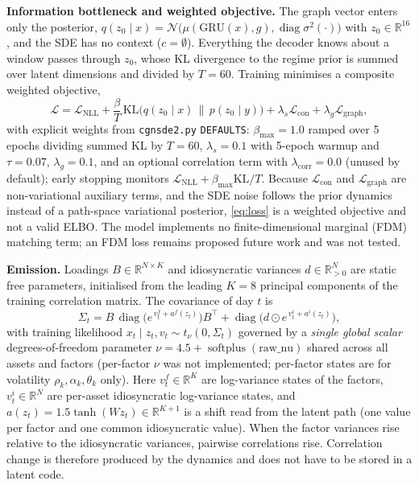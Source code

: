 \documentclass[journal]{IEEEtran}
\begin{document}
\textbf{Information bottleneck and weighted objective.} The graph vector enters only the posterior,
$q(z_0\mid x)=\mathcal{N}\big(\mu(\mathrm{GRU}(x),g),\operatorname{diag}\sigma^2(\cdot)\big)$ with
$z_0\in\mathbb{R}^{16}$, and the SDE has no context ($c=\emptyset$). Everything the decoder knows about a
window passes through $z_0$, whose KL divergence to the regime prior is summed over latent dimensions and
divided by $T=60$. Training minimises a composite weighted objective,
\begin{equation}
\mathcal{L} = \mathcal{L}_{\mathrm{NLL}} + \frac{\beta}{T}\,\mathrm{KL}\big(q(z_0\mid x)\,\|\,p(z_0\mid y)\big)
 + \lambda_{s}\mathcal{L}_{\mathrm{con}} + \lambda_{g}\mathcal{L}_{\mathrm{graph}},
\label{eq:loss}
\end{equation}
with explicit weights from \texttt{cgnsde2.py} \texttt{DEFAULTS}: $\beta_{\max}=1.0$ ramped over 5 epochs
dividing summed KL by $T=60$, $\lambda_s=0.1$ with 5-epoch warmup and $\tau=0.07$, $\lambda_g=0.1$, and an
optional correlation term with $\lambda_{\mathrm{corr}}=0.0$ (unused by default); early stopping monitors
$\mathcal{L}_{\mathrm{NLL}} + \beta_{\max}\mathrm{KL}/T$. Because $\mathcal{L}_{\mathrm{con}}$ and $\mathcal{L}_{\mathrm{graph}}$ are
non-variational auxiliary terms, and the SDE noise follows the prior dynamics instead of a path-space
variational posterior, \eqref{eq:loss} is a weighted objective and not a valid ELBO. The model
implements no finite-dimensional marginal (FDM) matching term; an FDM loss remains proposed future work and
was not tested.

\textbf{Emission.} Loadings $B\in\mathbb{R}^{N\times K}$ and idiosyncratic variances $d\in\mathbb{R}^N_{>0}$
are static free parameters, initialised from the leading $K=8$ principal components of the training
correlation matrix. The covariance of day $t$ is
\begin{equation}
\Sigma_t = B\,\operatorname{diag}\!\big(e^{\,v^{f}_t + a^{f}(z_t)}\big)B^{\top}
         + \operatorname{diag}\!\big(d\odot e^{\,v^{i}_t + a^{i}(z_t)}\big),
\label{eq:sigma}
\end{equation}
with training likelihood $x_t\mid z_t,v_t\sim t_\nu(0,\Sigma_t)$ governed by a \emph{single global scalar}
degrees-of-freedom parameter $\nu = 4.5 + \operatorname{softplus}(\mathrm{raw\_nu})$ shared across all assets
and factors (per-factor $\nu$ was not implemented; per-factor states are for volatility $\rho_k, \alpha_k,
\theta_k$ only). Here $v^{f}_t\in\mathbb{R}^K$ are
log-variance states of the factors, $v^{i}_t\in\mathbb{R}^N$ are per-asset idiosyncratic log-variance states,
and $a(z_t)=1.5\tanh(Wz_t)\in\mathbb{R}^{K+1}$ is a shift read from the latent path (one value per factor and
one common idiosyncratic value). When the factor variances rise relative to the idiosyncratic variances,
pairwise correlations rise. Correlation change is therefore produced by the dynamics and does not have to be
stored in a latent code.
\end{document}
